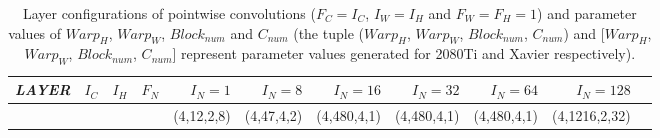 \begin{table}[]
\setlength{\tabcolsep}{5.5pt}
\caption{{\color{red}Layer configurations of pointwise convolutions ($F_C=I_C$, $I_W=I_H$ and $F_W=F_H=1$) and parameter values of $Warp_H$, $Warp_W$, $Block_{num}$ and $C_{num}$ (the tuple ($Warp_H$, $Warp_W$, $Block_{num}$, $C_{num}$) and [$Warp_H$, $Warp_W$, $Block_{num}$, $C_{num}$] represent parameter values generated for 2080Ti and Xavier respectively).}}
\vspace{-3mm}
\label{tab:rtxparas}
\begin{threeparttable}
\begin{tabular}{lrrrrrrrrrr }
\toprule
\textbf{\emph{LAYER}}& \textbf{$I_C$} & \textbf{$I_H$} & \textbf{$F_N$}& \textbf{$I_N=1$} & \textbf{$I_N=8$} &\textbf{$I_N=16$} & \textbf{$I_N=32$} &\textbf{$I_N=64$} & \textbf{$I_N=128$}\\
\midrule
\rowcolor{Gray}& & & &(\hspace{0.5em}4,\hspace{1em}12,\hspace{0.5em}2,\hspace{0.5em}\hspace{0.5em}8) &(\hspace{0.5em}4,\hspace{1em}47,\hspace{0.5em}4,\hspace{0.5em}\hspace{0.5em}2) &(\hspace{0.5em}4,\hspace{0.5em}480,\hspace{0.5em}4,\hspace{0.5em}\hspace{0.5em}1) &(\hspace{0.5em}4,\hspace{0.5em}480,\hspace{0.5em}4,\hspace{0.5em}\hspace{0.5em}1) &(\hspace{0.5em}4,\hspace{0.5em}480,\hspace{0.5em}4,\hspace{0.5em}\hspace{0.5em}1) &(\hspace{0.5em}4,1216,\hspace{0.5em}2,\hspace{0.5em}32) \\

\end{tabular}
\end{threeparttable}
\end{table}
